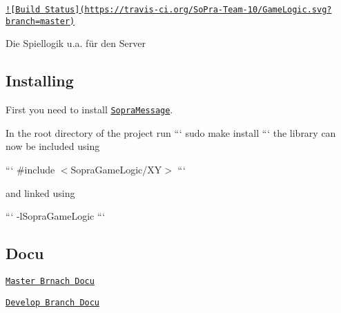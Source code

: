 \href{https://travis-ci.org/SoPra-Team-10/GameLogic}{\tt !\mbox{[}Build Status\mbox{]}(https\-://travis-\/ci.\-org/\-So\-Pra-\/\-Team-\/10/\-Game\-Logic.\-svg?branch=master)}

Die Spiellogik u.\-a. für den Server

\subsection*{Installing}

First you need to install \href{https://github.com/SoPra-Team-10/Messages}{\tt Sopra\-Message}.

In the root directory of the project run ``` sudo make install ``` the library can now be included using

``` \#include $<$Sopra\-Game\-Logic/\-X\-Y$>$ ```

and linked using

``` -\/l\-Sopra\-Game\-Logic ```

\subsection*{Docu}


\begin{DoxyItemize}
\item \href{https://sopra-team-10.github.io/GameLogic/master/html/index.html}{\tt Master Brnach Docu}
\item \href{https://sopra-team-10.github.io/GameLogic/Develop/html/index.html}{\tt Develop Branch Docu} 
\end{DoxyItemize}